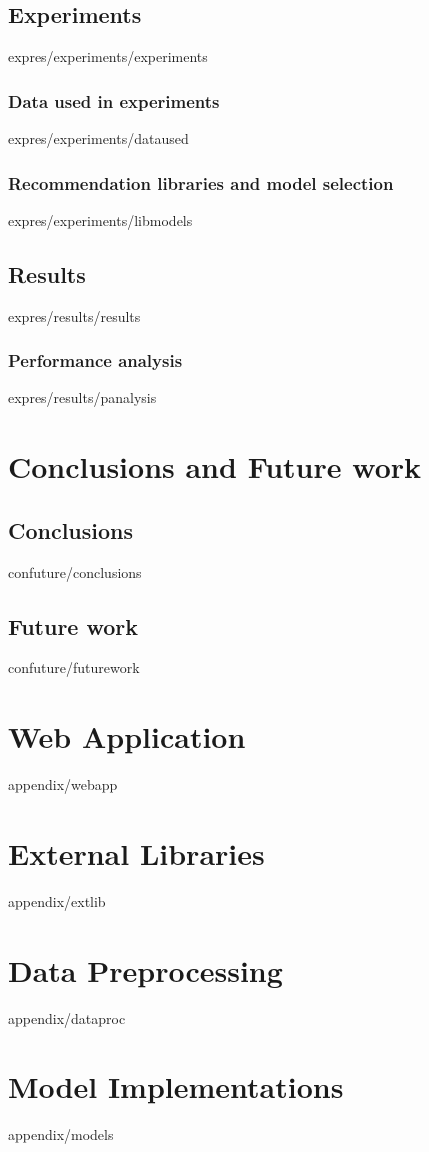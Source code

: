 \documentclass[english,epsbased,copyright,final,printable,covers,extendedindex,firstnumbered,tfg,gnuplot,loc,loe,lof,lot]{tfgtfmthesisuam}
\begin{document}
    \section{Experiments\label{SEC:EXPERIMENTS}}{expres/experiments/experiments}
      \subsection{Data used in experiments\label{SS:DATAUSED}}{expres/experiments/dataused}
      \subsection{Recommendation libraries and model selection\label{SS:LIBMODELS}}{expres/experiments/libmodels}
    \section{Results\label{SEC:RESULTS}}{expres/results/results}
      \subsection{Performance analysis\label{SS:PANALYSIS}}{expres/results/panalysis}

  \chapter{Conclusions and Future work\label{CAP:CONFUTURE}}
    \section{Conclusions\label{SEC:CONCLUSIONS}}{confuture/conclusions}
    \newpage
    \section{Future work\label{SEC:FUTUREWORK}}{confuture/futurework}

  \appendix
  \chapter{Web Application\label{AP:WEBAPP}}{appendix/webapp}
  \chapter{External Libraries\label{AP:EXTLIB}}{appendix/extlib}
  \chapter{Data Preprocessing\label{AP:DATAPROC}}{appendix/dataproc}
  \chapter{Model Implementations\label{AP:MODELS}}{appendix/models}
\end{document}
